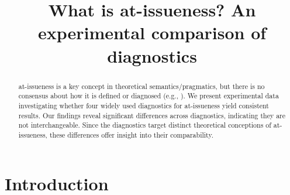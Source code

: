 \documentclass[times,linguex,xcolor]{glossa}
\title[What is at-issueness?]{What is at-issueness? An experimental comparison of diagnostics\\ 
  }
\author[]%
{%
}
\begin{document}
\maketitle


\begin{abstract}
  at-issueness is a key concept in theoretical semantics/pragmatics, but there is no consensus about how it is defined or diagnosed (e.g., \citealt{tonhauser_diagnosing_2012,tonhauser_how_2018,koev_notions_2018}). We present experimental data investigating whether four widely used diagnostics for at-issueness yield consistent results. Our findings reveal significant differences across diagnostics, indicating they are not interchangeable. Since the diagnostics target distinct theoretical conceptions of at-issueness, these differences offer insight into their comparability.

\end{abstract}


\section{Introduction \label{sec:1_introduction}}
\end{document}
